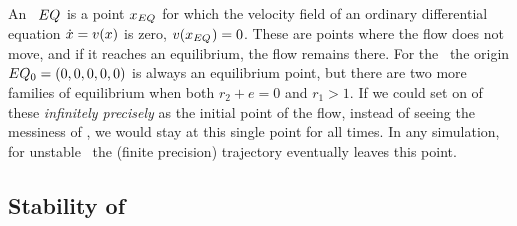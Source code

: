 
\subsection{\Eqva}

An \eqv\ $EQ_{}$ is a point $x_{EQ_{}}$ for which the
velocity field of an ordinary differential equation
$\dot{x} = v(x)$ is zero, $v(x_{EQ_{}})=0$. These
are points where the flow does not move, and if it reaches an
equilibrium, the flow remains there. For the \cLe\, the
origin $EQ_{0}=(0, 0, 0, 0, 0)$ is always an equilibrium
point, but there are two more families of equilibrium when
both $r_2 + e=0$ and $r_1>1$. If we could set on of these
{\em infinitely precisely} as the initial point of the flow,
instead of seeing the messiness of , we
would stay at this single point for all times. In any
simulation, for unstable \reqv\ the (finite precision)
trajectory eventually leaves this point.

\subsection{Stability of \eqva}

